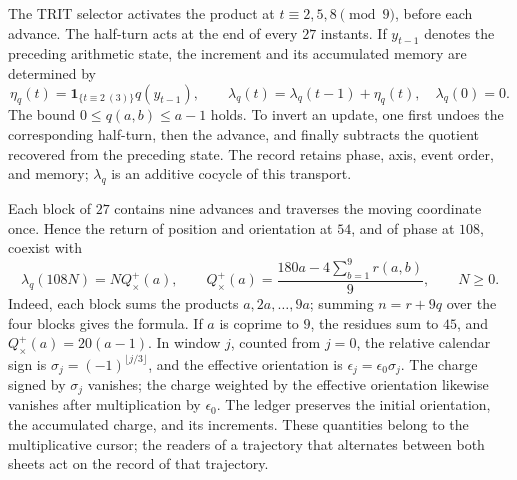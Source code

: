 The TRIT selector activates the product at \(t\equiv2,5,8\pmod9\),
before each advance. The half-turn acts at the end of every
\(27\) instants. If \(y_{t-1}\) denotes the preceding arithmetic
state, the increment and its accumulated memory are determined by
\begin{equation}
 \eta_q(t)=\mathbf1_{\{t\equiv2\ (3)\}}q(y_{t-1}),\qquad
 \lambda_q(t)=\lambda_q(t-1)+\eta_q(t),\quad \lambda_q(0)=0.
 \label{prd-arit:incremento}
\end{equation}
The bound \(0\leq q(a,b)\leq a-1\) holds. To invert an
update, one first undoes the corresponding half-turn,
then the advance, and finally subtracts the quotient recovered from the
preceding state. The record retains phase, axis, event order, and
memory; \(\lambda_q\) is an additive cocycle of this transport.

Each block of \(27\) contains nine advances and traverses the
moving coordinate once. Hence the return of position and orientation
at \(54\), and of phase at \(108\), coexist with
\begin{equation}
 \lambda_q(108N)=NQ_\times^+(a),\qquad
 Q_\times^+(a)=\frac{180a-4\sum_{b=1}^9r(a,b)}9,
 \qquad N\geq0.
 \label{prd-arit:retorno}
\end{equation}
Indeed, each block sums the products \(a,2a,\ldots,9a\);
summing \(n=r+9q\) over the four blocks gives the formula. If
\(a\) is coprime to \(9\), the residues sum to \(45\), and
\(Q_\times^+(a)=20(a-1)\). In window \(j\), counted from
\(j=0\), the relative calendar sign is
\(\sigma_j=(-1)^{\lfloor j/3\rfloor}\), and the effective
orientation is \(\epsilon_j=\epsilon_0\sigma_j\).
The charge signed by \(\sigma_j\) vanishes; the charge weighted
by the effective orientation likewise vanishes after multiplication by
\(\epsilon_0\). The ledger preserves the initial orientation, the accumulated
charge, and its increments. These quantities belong
to the multiplicative cursor; the readers of a trajectory that
alternates between both sheets act on the record of that trajectory.
